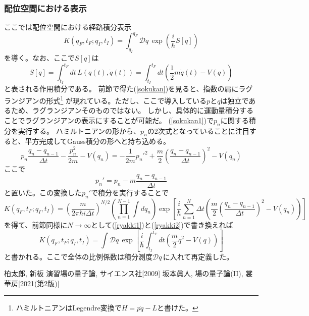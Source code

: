 \documentclass[10pt]{jsarticle}
\newcommand{\kakko}[1]{\left(#1 \right)} %
\newcommand{\kkakko}[1]{\left[ #1 \right]} %
\newcommand{\pms}[1]{\mathcal{D}#1\,}%
\numberwithin{equation}{section}%
\begin{document}
\subsubsection{配位空間における表示}
ここでは配位空間における経路積分表示
\begin{equation}
  K(q_{F},t_{F};q_{I},t_{I})=\int_{q_I}^{q_{F}} \pms{q}\exp\kakko{\frac{i}{\hbar}S[q]}
\end{equation}
を導く。なお、ここで$S[q]$は
\begin{equation}
  S[q]=\int_{t_{I}}^{t_{F}} dt \, L(q(t),\dot{q}(t))=\int_{t_{I}}^{t_{F}} dt\kakko{\frac{1}{2}m\dot{q}(t)-V(q)}
\end{equation}
と表される作用積分である。
前節で得た(\ref{sokukan})を見ると、指数の肩にラグランジアンの形式\footnote{ハミルトニアンはLegendre変換で$H=p\dot{q}-L$と書けた。}
が現れている。ただし、ここで導入している$p$と$q$は独立であるため、ラグランジアンそのものではない。
しかし、具体的に運動量積分することでラグランジアンの表示にすることが可能だ。
(\ref{sokukan1})で$p_{n}$に関する積分を実行する。
ハミルトニアンの形から、$p_{n}$の2次式となっていることに注目すると、平方完成してGauss積分の形へと持ち込める。
\begin{equation}
  p_{n}\frac{q_{n}-q_{n-1}}{\Delta t} - \frac{p_{n}^{2}}{2m}-V(q_{n})=-\frac{1}{2m}p_{n}'^{2}+\frac{m}{2}\kakko{\frac{q_{n}-q_{n-1}}{\Delta t}}^{2}-V(q_{n})
\end{equation}
ここで
\begin{equation}
  p_{n}'=p_{n}-m\frac{q_{n}-q_{n-1}}{\Delta t}
\end{equation}
と置いた。この変換した$p_{n}'$で積分を実行することで
\begin{equation}
  K(q_{F},t_{F};q_{I},t_{I})=\kakko{\frac{m}{2\pi\hbar i \Delta t}}^{N/2} \kakko{\prod_{n=1}^{N-1}\int dq_{n}}\exp\kkakko{\frac{i}{\hbar}\sum_{n=1}^{N}\Delta t \kakko{\frac{m}{2}\kakko{\frac{q_{n}-q_{n-1}}{\Delta t}}^{2}-V(q_{n}) }}
\end{equation}
を得て、前節同様に$N\to \infty$として(\ref{ryakki1})と(\ref{ryakki2})で書き換えれば
\begin{equation}
  K(q_{F},t_{F};q_{I},t_{I})=\int \pms{q}\exp\kkakko{\frac{i}{\hbar}\int_{t_{I}}^{t_{F}}dt\kakko{\frac{m}{2}\dot{q}^{2}-V(q) }}
\end{equation}
と書かれる。ここで全体の比例係数は積分測度$\pms{q}$に入れて再定義した。
\begin{thebibliography}{99}
   柏太郎, 新板 演習場の量子論, サイエンス社[2009]   
   坂本眞人, 場の量子論(II), 裳華房[2021(第2版)]   
\end{thebibliography}
\end{document}
